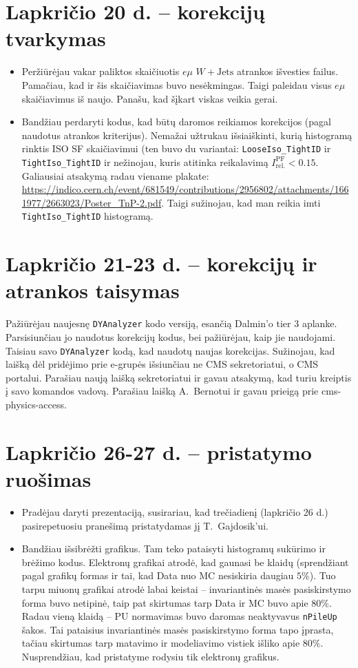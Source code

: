 \documentclass[a4paper, 12pt]{article}
\newcommand{\WJets}{W\! +\!\mathrm{Jets}}
\newcommand{\emu}{e\mu}
\newcommand{\ttt}[1]{\texttt{#1}}
\begin{document}
\section{Lapkričio 20 d. -- korekcijų tvarkymas}
\begin{itemize}
	\item Peržiūrėjau vakar paliktos skaičiuotis $\emu$ $\WJets$ atrankos išvesties failus. Pamačiau, kad
	ir šis skaičiavimas buvo nesėkmingas. Taigi paleidau visus $\emu$ skaičiavimus iš naujo. Panašu, kad
	šįkart viskas veikia gerai.
	\item Bandžiau perdaryti kodus, kad būtų daromos reikiamos korekcijos (pagal naudotus atrankos kriterijus).
	Nemažai užtrukau išsiaiškinti, kurią histogramą rinktis ISO SF skaičiavimui (ten buvo du variantai:
	\ttt{LooseIso\_TightID} ir \ttt{TightIso\_TightID} ir nežinojau, kuris atitinka reikalavimą
	$I^{\mathrm{PF}}_{\mathrm{rel.}} < 0.15$. Galiausiai atsakymą radau viename plakate:
	\url{https://indico.cern.ch/event/681549/contributions/2956802/attachments/1661977/2663023/Poster_TnP-2.pdf}.
	Taigi sužinojau, kad man reikia imti \ttt{TightIso\_TightID} histogramą.
\end{itemize}

\section{Lapkričio 21-23 d. -- korekcijų ir atrankos taisymas}

Pažiūrėjau naujesnę \ttt{DYAnalyzer} kodo versiją, esančią Dalmin'o tier 3 aplanke.
Parsisiunčiau jo naudotus korekcijų kodus, bei pažiūrėjau, kaip jie naudojami.
Taisiau savo \ttt{DYAnalyzer} kodą, kad naudotų naujas korekcijas.
Sužinojau, kad laišką dėl pridėjimo prie e-grupės išsiunčiau ne CMS sekretoriatui, o CMS portalui.
Parašiau naują laišką sekretoriatui ir gavau atsakymą, kad turiu kreiptis į savo komandos vadovą.
Parašiau laišką A.\ Bernotui ir gavau prieigą prie cms-physics-access.

\section{Lapkričio 26-27 d. -- pristatymo ruošimas}
\begin{itemize}
	\item Pradėjau daryti prezentaciją, susirariau, kad trečiadienį (lapkričio 26 d.) pasirepetuosiu pranešimą
	pristatydamas jį T.\ Gajdosik'ui.
	\item Bandžiau išsibrėžti grafikus. Tam teko pataisyti histogramų sukūrimo ir brėžimo kodus. Elektronų grafikai
	atrodė, kad gaunasi be klaidų (sprendžiant pagal grafikų formas ir tai, kad Data nuo MC nesiskiria daugiau $5\%$).
	Tuo tarpu miuonų grafikai atrodė labai keistai -- invariantinės masės pasiskirstymo forma buvo netipinė, taip pat
	skirtumas tarp Data ir MC buvo apie $80\%$.
	Radau vieną klaidą -- PU normavimas buvo daromas neaktyvavus \ttt{nPileUp} šakos.
	Tai pataisius invariantinės masės pasiskirstymo forma tapo įprasta, tačiau skirtumas tarp matavimo ir modeliavimo
	vistiek išliko apie $80\%$. Nusprendžiau, kad pristatyme rodysiu tik elektronų grafikus.
\end{itemize}
\end{document}
